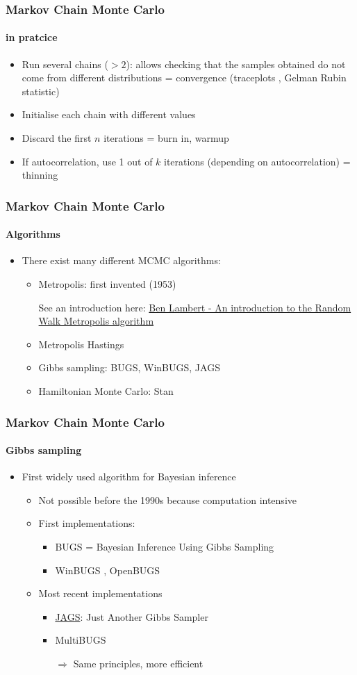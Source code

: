 \documentclass{beamer}
\begin{document}
\begin{frame}
\frametitle{Markov Chain Monte Carlo}
\framesubtitle{in pratcice}
\begin{itemize}
 \item{Run several chains ($> 2$): allows checking that the samples obtained do not come from different distributions = convergence (traceplots , Gelman Rubin statistic)}
 \item{Initialise each chain with different values}
 \item{Discard the first $n$ iterations = burn in, warmup}
 \item{If autocorrelation, use 1 out of $k$ iterations (depending on autocorrelation) = thinning}
\end{itemize}
\end{frame}

\begin{frame}
\frametitle{Markov Chain Monte Carlo}
\framesubtitle{Algorithms}
\begin{itemize}
  \item{There exist many different MCMC algorithms:}
 \begin{itemize}
  \item{Metropolis: first invented (1953)}
  \item[]{\scriptsize See an introduction here: \href{https:youtu.be/U561HGMWjcw}{Ben Lambert - An introduction to the Random Walk Metropolis algorithm}}
  \item{Metropolis Hastings}
  \item{Gibbs sampling: BUGS, WinBUGS, JAGS}
 \item{Hamiltonian Monte Carlo: Stan}
 \end{itemize}
\end{itemize}
\end{frame}

\begin{frame}
\frametitle{Markov Chain Monte Carlo}
\framesubtitle{Gibbs sampling}
\begin{itemize}
 \item{First widely used algorithm for Bayesian inference}
 \begin{itemize}
 \item{Not possible before the 1990s because computation intensive}
 \item{First implementations:}
  \begin{itemize}
   \item{BUGS = Bayesian Inference Using Gibbs Sampling}
   \item{WinBUGS , OpenBUGS}
  \end{itemize}
 \item{Most recent implementations}
  \begin{itemize}
   \item{\href{https://sourceforge.net/projects/mcmc-jags/files/}{JAGS}: Just Another Gibbs Sampler}
   \item{MultiBUGS}
   \item[$\Rightarrow$]{Same principles, more efficient}
  \end{itemize}
 \end{itemize}
\end{itemize}
\end{frame}
\end{document}

